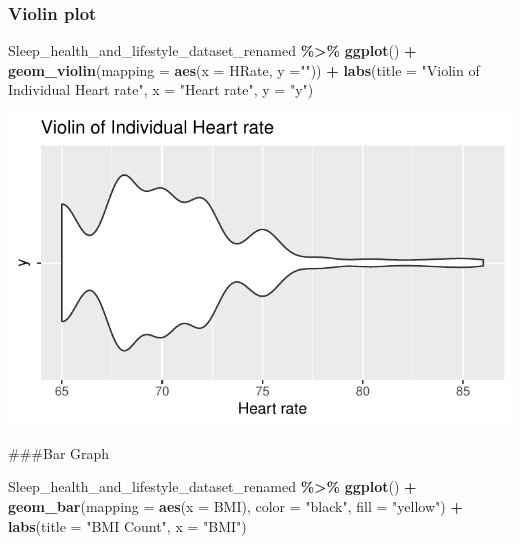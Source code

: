 \documentclass[
  11pt,
]{article}
\newenvironment{Shaded}{\begin{snugshade}}{\end{snugshade}}
\newcommand{\AttributeTok}[1]{\textcolor[rgb]{0.13,0.29,0.53}{#1}}
\newcommand{\FunctionTok}[1]{\textcolor[rgb]{0.13,0.29,0.53}{\textbf{#1}}}
\newcommand{\NormalTok}[1]{#1}
\newcommand{\SpecialCharTok}[1]{\textcolor[rgb]{0.81,0.36,0.00}{\textbf{#1}}}
\newcommand{\StringTok}[1]{\textcolor[rgb]{0.31,0.60,0.02}{#1}}
\begin{document}
\hypertarget{violin-plot}{%
\subsubsection{Violin plot}\label{violin-plot}}

\begin{Shaded}
\begin{Highlighting}[]
\NormalTok{Sleep\_health\_and\_lifestyle\_dataset\_renamed }\SpecialCharTok{\%\textgreater{}\%}
  \FunctionTok{ggplot}\NormalTok{() }\SpecialCharTok{+}
    \FunctionTok{geom\_violin}\NormalTok{(}\AttributeTok{mapping =} \FunctionTok{aes}\NormalTok{(}\AttributeTok{x =}\NormalTok{ HRate, }\AttributeTok{y =}\StringTok{""}\NormalTok{)) }\SpecialCharTok{+}
    \FunctionTok{labs}\NormalTok{(}\AttributeTok{title =} \StringTok{"Violin of Individual Heart rate"}\NormalTok{, }\AttributeTok{x =} \StringTok{"Heart rate"}\NormalTok{, }\AttributeTok{y =} \StringTok{"y"}\NormalTok{)}
\end{Highlighting}
\end{Shaded}

\begin{center}\includegraphics[width=0.7\linewidth]{SleepHelath_files/figure-latex/unnamed-chunk-9-1} \end{center}

\#\#\#Bar Graph

\begin{Shaded}
\begin{Highlighting}[]
\NormalTok{Sleep\_health\_and\_lifestyle\_dataset\_renamed }\SpecialCharTok{\%\textgreater{}\%}
  \FunctionTok{ggplot}\NormalTok{() }\SpecialCharTok{+}
    \FunctionTok{geom\_bar}\NormalTok{(}\AttributeTok{mapping =} \FunctionTok{aes}\NormalTok{(}\AttributeTok{x =}\NormalTok{ BMI), }\AttributeTok{color =} \StringTok{"black"}\NormalTok{, }\AttributeTok{fill =} \StringTok{"yellow"}\NormalTok{) }\SpecialCharTok{+}
    \FunctionTok{labs}\NormalTok{(}\AttributeTok{title =} \StringTok{"BMI Count"}\NormalTok{, }\AttributeTok{x =} \StringTok{"BMI"}\NormalTok{)}
\end{Highlighting}
\end{Shaded}
\end{document}
